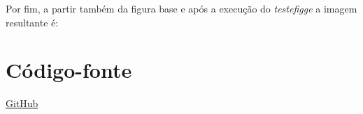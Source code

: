 \documentclass[12pt]{article}
\begin{document}
Por fim, a partir também da figura base e após a execução do \emph{testefigge} a imagem resultante é:

\section{Código-fonte}
\href{https://github.com/lucasjoao/paradigmas/tree/master/Prolog/T2c}
{GitHub}
\end{document}
